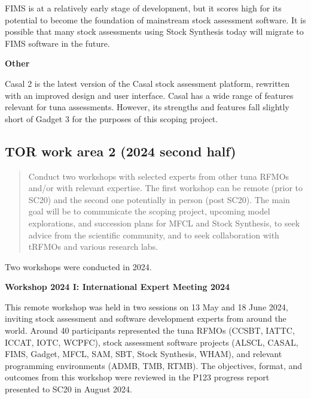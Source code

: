 \documentclass{SCreport}
\begin{document}
FIMS is at a relatively early stage of development, but it scores high for its
potential to become the foundation of mainstream stock assessment software. It
is possible that many stock assessments using Stock Synthesis today will migrate
to FIMS software in the future.

\vspace{1ex}

\textbf{Other}

\vspace{-1ex}

Casal 2 is the latest version of the Casal stock assessment platform, rewritten
with an improved design and user interface. Casal has a wide range of features
relevant for tuna assessments. However, its strengths and features fall slightly
short of Gadget 3 for the purposes of this scoping project.

\vspace{2ex}

\hypertarget{link:tor-2}{}
\subsection{TOR work area 2 (2024 second half)}
\label{sec:tor-2}

\begin{quote}\sf
  Conduct two workshops with selected experts from other tuna RFMOs and/or with
  relevant expertise. The first workshop can be remote (prior to SC20) and the
  second one potentially in person (post SC20). The main goal will be to
  communicate the scoping project, upcoming model explorations, and succession
  plans for MFCL and Stock Synthesis, to seek advice from the scientific
  community, and to seek collaboration with tRFMOs and various research labs.
\end{quote}

\vspace{2ex}

Two workshops were conducted in 2024.

\vspace{2ex}

\textbf{Workshop 2024 I: International Expert Meeting 2024}

This remote workshop was held in two sessions on 13 May and 18 June 2024,
inviting stock assessment and software development experts from around the
world. Around 40 participants represented the tuna RFMOs (CCSBT, IATTC, ICCAT,
IOTC, WCPFC), stock assessment software projects (ALSCL, CASAL, FIMS, Gadget,
MFCL, SAM, SBT, Stock Synthesis, WHAM), and relevant programming environments
(ADMB, TMB, RTMB). The objectives, format, and outcomes from this workshop were
reviewed in the P123 progress report presented to SC20 in August 2024.
\end{document}
